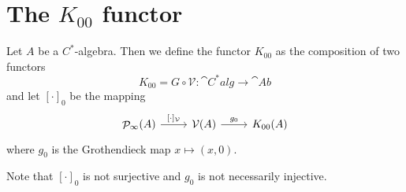 \section{The $K_{00}$ functor}
\begin{definition}
Let $A$ be a $C^*$-algebra. Then we define the functor $K_{00}$ as the composition of two functors
\[ K_{00} = G \circ \mathcal{V}: \cat{C^*alg} \to \cat{Ab} \]
and let $[\cdot]_{0}$ be the mapping
\[ \begin{tikzcd}
\Projections_\infty(A) \rar["{[\cdot]_\mathcal{V}}"] & \mathcal{V}(A) \rar["g_0"] & K_{00}(A)
\end{tikzcd} \]
where $g_0$ is the Grothendieck map $x\mapsto (x,0)$.
\end{definition}
Note that $[\cdot]_{0}$ is not surjective and $g_0$ is not necessarily injective.

